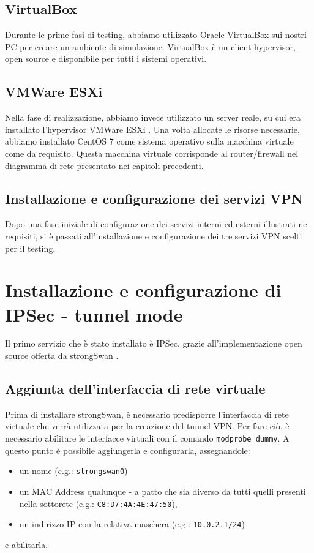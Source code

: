 \subsection{VirtualBox}
Durante le prime fasi di testing, abbiamo utilizzato Oracle VirtualBox \cite{virtualbox} sui nostri PC per creare un ambiente di simulazione. VirtualBox è un client hypervisor, open source e disponibile per tutti i sistemi operativi.
\subsection{VMWare ESXi}
Nella fase di realizzazione, abbiamo invece utilizzato un server reale, su cui era installato l'hypervisor VMWare ESXi \cite{esxi}. Una volta allocate le risorse necessarie, abbiamo installato CentOS 7 come sistema operativo sulla macchina virtuale come da requisito.
Questa macchina virtuale corrisponde al router/firewall nel diagramma di rete presentato nei capitoli precedenti.

\subsection{Installazione e configurazione dei servizi VPN}
Dopo una fase iniziale di configurazione dei servizi interni ed esterni illustrati nei requisiti, si è passati all'installazione e configurazione dei tre servizi VPN scelti per il testing.

\section{Installazione e configurazione di IPSec - tunnel mode}
Il primo servizio che è stato installato è IPSec, grazie all'implementazione open source offerta da strongSwan \cite{strongSwan}.


\subsection{Aggiunta dell'interfaccia di rete virtuale}
Prima di installare strongSwan, è necessario predisporre l'interfaccia di rete virtuale che verrà utilizzata per la creazione del tunnel VPN. Per fare ciò, è necessario abilitare le interfacce virtuali con il comando \texttt{modprobe dummy}.
A questo punto è possibile aggiungerla e configurarla, assegnandole:
\begin{itemize}
    \item un nome (e.g.: \texttt{strongswan0})
    \item un MAC Address qualunque - a patto che sia diverso da tutti quelli presenti nella sottorete (e.g.: \texttt{C8:D7:4A:4E:47:50}),
    \item un indirizzo IP con la relativa maschera (e.g.: \texttt{10.0.2.1/24})
\end{itemize}
e abilitarla.

